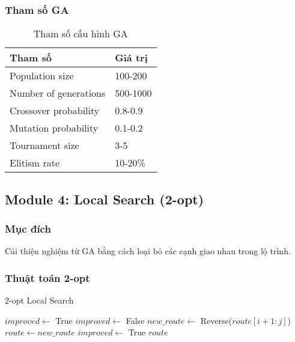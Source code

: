 \documentclass[12pt,a4paper]{article}
\begin{document}
\subsubsection{Tham số GA}

\begin{table}[h]
\centering
\begin{tabular}{@{}ll@{}}
\toprule
\textbf{Tham số} & \textbf{Giá trị} \\ \midrule
Population size & 100-200 \\
Number of generations & 500-1000 \\
Crossover probability & 0.8-0.9 \\
Mutation probability & 0.1-0.2 \\
Tournament size & 3-5 \\
Elitism rate & 10-20\% \\ \bottomrule
\end{tabular}
\caption{Tham số cấu hình GA}
\end{table}

\subsection{Module 4: Local Search (2-opt)}

\subsubsection{Mục đích}
Cải thiện nghiệm từ GA bằng cách loại bỏ các cạnh giao nhau trong lộ trình.

\subsubsection{Thuật toán 2-opt}

\begin{algorithm}
\caption{2-opt Local Search}
\begin{algorithmic}[1]
    \State $improved \gets$ True
        \State $improved \gets$ False
                \State $new\_route \gets$ Reverse($route[i+1:j]$)
                    \State $route \gets new\_route$
                    \State $improved \gets$ True
                \EndIf
            \EndFor
        \EndFor
    \EndWhile
    \State \Return $route$
\EndFunction
\end{algorithmic}
\end{algorithm}
\end{document}
